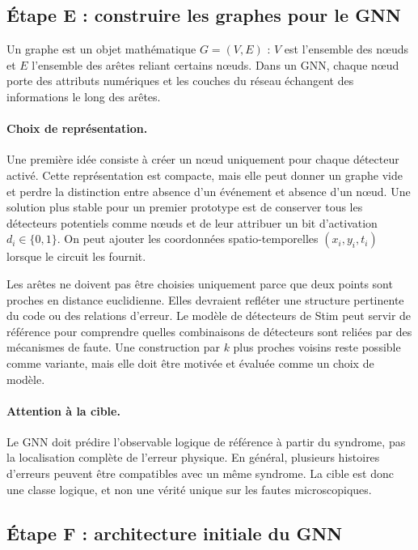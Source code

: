 \documentclass[11pt,a4paper]{article}
\begin{document}
\subsection{Étape E : construire les graphes pour le GNN}

Un graphe est un objet mathématique $G=(V,E)$ : $V$ est l'ensemble des
nœuds et $E$ l'ensemble des arêtes reliant certains nœuds. Dans un GNN,
chaque nœud porte des attributs numériques et les couches du réseau
échangent des informations le long des arêtes.

\paragraph{Choix de représentation.}
Une première idée consiste à créer un nœud uniquement pour chaque
détecteur activé. Cette représentation est compacte, mais elle peut donner
un graphe vide et perdre la distinction entre absence d'un événement et
absence d'un nœud. Une solution plus stable pour un premier prototype est
de conserver tous les détecteurs potentiels comme nœuds et de leur attribuer
un bit d'activation $d_i\in\{0,1\}$. On peut ajouter les coordonnées
spatio-temporelles $(x_i,y_i,t_i)$ lorsque le circuit les fournit.

Les arêtes ne doivent pas être choisies uniquement parce que deux points
sont proches en distance euclidienne. Elles devraient refléter une
structure pertinente du code ou des relations d'erreur. Le modèle de
détecteurs de Stim peut servir de référence pour comprendre quelles
combinaisons de détecteurs sont reliées par des mécanismes de faute. Une
construction par $k$ plus proches voisins reste possible comme variante,
mais elle doit être motivée et évaluée comme un choix de modèle.

\paragraph{Attention à la cible.}
Le GNN doit prédire l'observable logique de référence à partir du syndrome,
pas la localisation complète de l'erreur physique. En général, plusieurs
histoires d'erreurs peuvent être compatibles avec un même syndrome. La
cible est donc une classe logique, et non une vérité unique sur les fautes
microscopiques.

\subsection{Étape F : architecture initiale du GNN}
\end{document}
